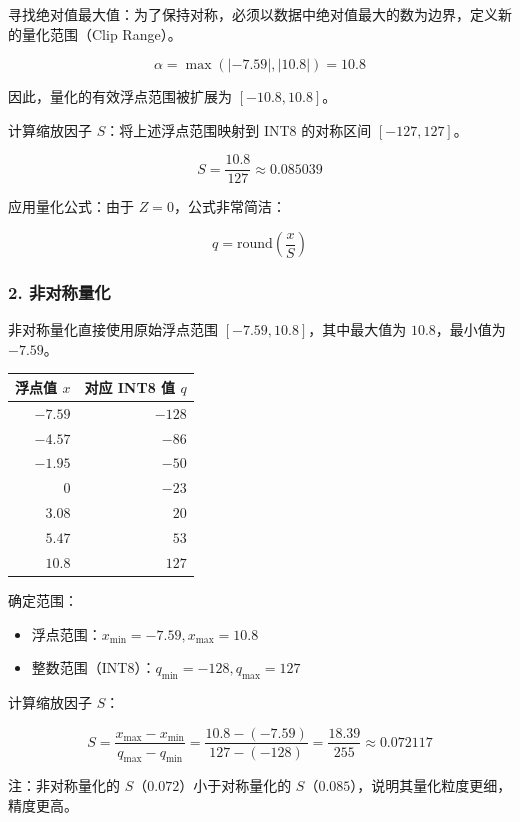 寻找绝对值最大值：为了保持对称，必须以数据中绝对值最大的数为边界，定义新的量化范围（Clip Range）。

\[
\alpha = \max(|-7.59|, |10.8|) = 10.8
\]

因此，量化的有效浮点范围被扩展为 \([-10.8, 10.8]\)。

计算缩放因子 \(S\)：将上述浮点范围映射到 INT8 的对称区间 \([-127, 127]\)。

\[
S = \frac{10.8}{127} \approx 0.085039
\]

应用量化公式：由于 \(Z = 0\)，公式非常简洁：

\[
q = \mathrm{round}\left(\frac{x}{S}\right)
\]

\hypertarget{ux975eux5bf9ux79f0ux91cfux5316}{%
\subsubsection{2. 非对称量化}\label{ux975eux5bf9ux79f0ux91cfux5316}}

非对称量化直接使用原始浮点范围 \([-7.59, 10.8]\)，其中最大值为 \(10.8\)，最小值为 \(-7.59\)。

\begin{longtable}[]{@{}rr@{}}
\toprule
浮点值 \(x\) & 对应 INT8 值 \(q\) \\
\midrule
\endhead
\(-7.59\) & \(-128\) \\
\(-4.57\) & \(-86\) \\
\(-1.95\) & \(-50\) \\
\(0\) & \(-23\) \\
\(3.08\) & \(20\) \\
\(5.47\) & \(53\) \\
\(10.8\) & \(127\) \\
\bottomrule
\end{longtable}

确定范围：

\begin{itemize}
\tightlist
\item
  浮点范围：\(x_{\min} = -7.59, x_{\max} = 10.8\)
\item
  整数范围（INT8）：\(q_{\min} = -128, q_{\max} = 127\)
\end{itemize}

计算缩放因子 \(S\)：

\[
S = \frac{x_{\max} - x_{\min}}{q_{\max} - q_{\min}}
  = \frac{10.8 - (-7.59)}{127 - (-128)}
  = \frac{18.39}{255}
  \approx 0.072117
\]

注：非对称量化的 \(S\)（\(0.072\)）小于对称量化的 \(S\)（\(0.085\)），说明其量化粒度更细，精度更高。

